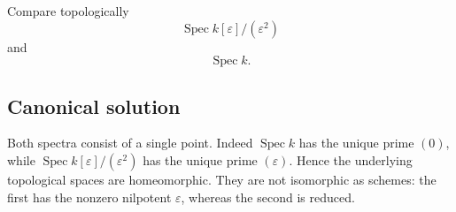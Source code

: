 
\begin{exercise}
	Compare topologically
	\[
	\operatorname{Spec} k[\varepsilon]/(\varepsilon^2)
	\]
	and
	\[
	\operatorname{Spec} k.
	\]
\end{exercise}

\subsection*{Canonical solution}
Both spectra consist of a single point. Indeed $\operatorname{Spec} k$ has the unique prime $(0)$, while $\operatorname{Spec} k[\varepsilon]/(\varepsilon^2)$ has the unique prime $(\varepsilon)$. Hence the underlying topological spaces are homeomorphic. They are not isomorphic as schemes: the first has the nonzero nilpotent $\varepsilon$, whereas the second is reduced.
